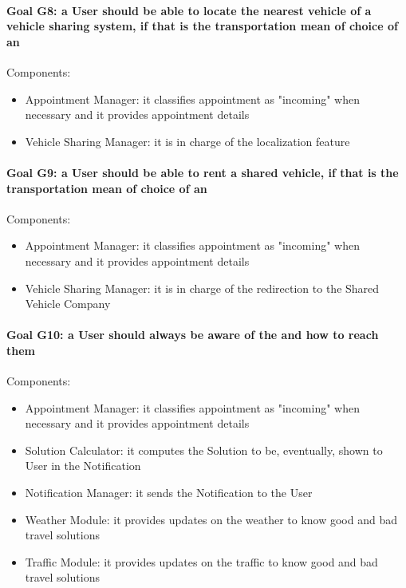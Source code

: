 \paragraph{Goal G8: a User should be able to locate the nearest vehicle of a vehicle sharing system, if that is the transportation mean of choice of an }
	Components:
	\begin{itemize}[label=--]
		\item Appointment Manager: it classifies appointment as "incoming" when necessary and it provides appointment details
		\item Vehicle Sharing Manager: it is in charge of the localization feature
	\end{itemize}

\paragraph{Goal G9: a User should be able to rent a shared vehicle, if that is the transportation mean of choice of an }
	Components:
	\begin{itemize}[label=--]
		\item Appointment Manager: it classifies appointment as "incoming" when necessary and it provides appointment details
		\item Vehicle Sharing Manager: it is in charge of the redirection to the Shared Vehicle Company
	\end{itemize}

\paragraph{Goal G10: a User should always be aware of the  and how to reach them}
	Components:
	\begin{itemize}[label=--]
		\item Appointment Manager: it classifies appointment as "incoming" when necessary and it provides appointment details
		\item Solution Calculator: it computes the Solution to be, eventually, shown to User in the Notification
		\item Notification Manager: it sends the Notification to the User
		\item Weather Module: it provides updates on the weather to know good and bad travel solutions
		\item Traffic Module: it provides updates on the traffic to know good and bad travel solutions
	\end{itemize}